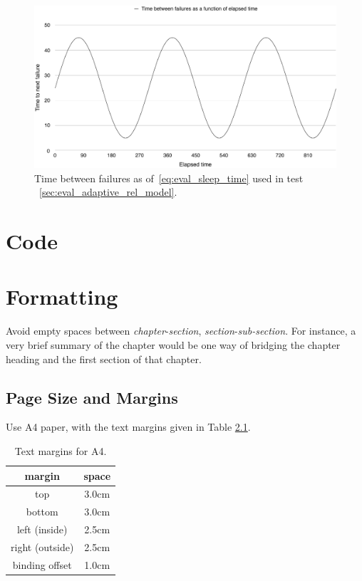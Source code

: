 \documentclass{cslthse-msc}
\begin{document}
\begin{appendices}
\begin{figure}[!hbt]
\centering
\includegraphics[scale=0.5]{images/sinus_failure_times.pdf}
\caption{Time between failures as of~\cref{eq:eval_sleep_time} used in test ~\ref{sec:eval_adaptive_rel_model}.} \label{fig:eval_sleep_time}
\end{figure}

\chapter{Code} \label{appendix:code}

\end{appendices}









\iffalse


\chapter[Short on Formatting]{Formatting}
Avoid empty spaces between \textit{chapter}-\textit{section}, \textit{section}-\textit{sub-section}. For instance, a very brief summary of the chapter would be one way of bridging the chapter heading and the first section of that chapter.
\section{Page Size and Margins}
Use A4 paper, with the text margins given in Table \ref{tab:margins}.
\begin{table}[!hbt]
\centering
\caption{Text margins for A4.}\label{tab:margins}
\begin{tabular}{cc}
\hline
\textbf{margin} & \textbf{space} \\
\hline 
top &  3.0cm\\ 

bottom & 3.0cm \\ 
 
left (inside) & 2.5cm \\ 

right (outside) & 2.5cm \\ 

binding offset & 1.0cm \\ 
\hline 
\end{tabular} 
\end{table}
\end{document}
